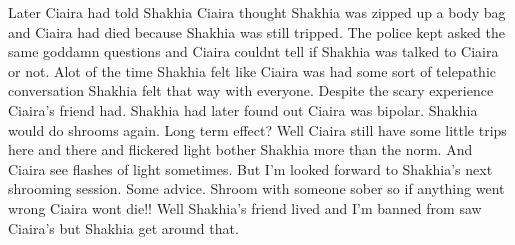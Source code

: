 \documentclass[12pt]{book}
\begin{document}
Later Ciaira had told Shakhia Ciaira thought Shakhia was zipped up a body bag and Ciaira had died because Shakhia was still tripped. The police kept asked the same goddamn questions and Ciaira couldnt tell if Shakhia was talked to Ciaira or not. Alot of the time Shakhia felt like Ciaira was had some sort of telepathic conversation Shakhia felt that way with everyone. Despite the scary experience Ciaira's friend had. Shakhia had later found out Ciaira was bipolar. Shakhia would do shrooms again. Long term effect? Well Ciaira still have some little trips here and there and flickered light bother Shakhia more than the norm. And Ciaira see flashes of light sometimes. But I'm looked forward to Shakhia's next shrooming session. Some advice. Shroom with someone sober so if anything went wrong Ciaira wont die!! Well Shakhia's friend lived and I'm banned from saw Ciaira's but Shakhia get around that.
\end{document}
